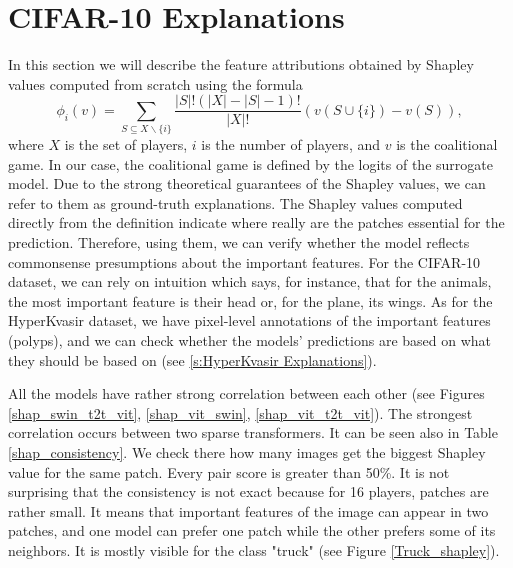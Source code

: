 \documentclass[magisterska,en]{pracamgr}
\begin{document}
\section{CIFAR-10 Explanations}
In this section we will describe the feature attributions obtained by Shapley values computed from scratch using the formula
  \begin{equation*}
      \phi_i(v) = \sum_{S\subseteq X\backslash \{i\}} \frac{|S|!(|X|-|S|-1)!}{|X|!}\left(v(S \cup \{i\}) - v(S)\right),
  \end{equation*}
where $X$ is the set of players, $i$ is the number of players, and $v$ is the coalitional game. In our case, the coalitional game is defined by the logits of the surrogate model. Due to the strong theoretical guarantees of the Shapley values, we can refer to them as ground-truth explanations. The Shapley values computed directly from the definition indicate where really are the patches essential for the prediction. Therefore, using them, we can verify whether the model reflects commonsense presumptions about the important features. For the CIFAR-10 dataset, we can rely on intuition which says, for instance, that for the animals, the most important feature is their head or, for the plane, its wings. As for the HyperKvasir dataset, we have pixel-level annotations of the important features (polyps), and we can check whether the models' predictions are based on what they should be based on (see \ref{s:HyperKvasir Explanations}).





All the models have rather strong correlation between each other (see Figures \ref{shap_swin_t2t_vit}, \ref{shap_vit_swin}, \ref{shap_vit_t2t_vit}). The strongest correlation occurs between two sparse transformers. It can be seen also in Table \ref{shap_consistency}. We check there how many images get the biggest Shapley value for the same patch. Every pair score is greater than 50\%. It is not surprising that the consistency is not exact because for 16 players, patches are rather small. It means that important features of the image can appear in two patches, and one model can prefer one patch while the other prefers some of its neighbors. It is mostly visible for the class "truck" (see Figure \ref{Truck_shapley}). 
\end{document}
